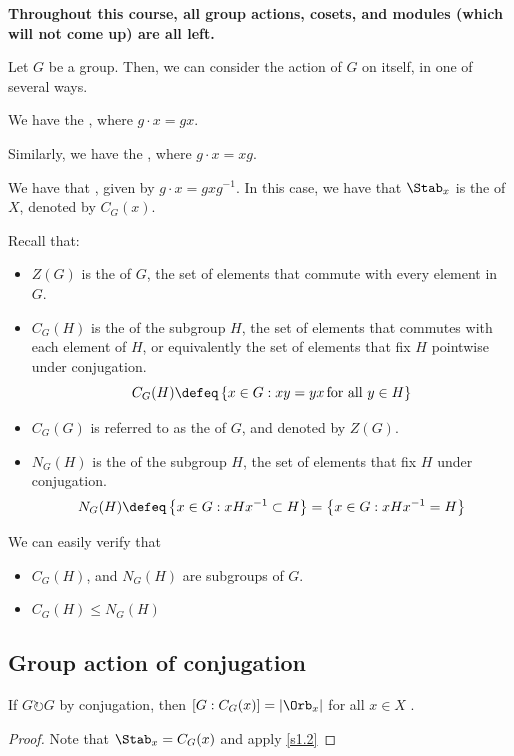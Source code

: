 \documentclass[12pt]{scrartcl}
\begin{document}
\textbf{Throughout this course, all group actions, cosets, and modules (which will not come up) are all left.}
\begin{example}
Let $G$ be a group.
Then, we can consider the action of $G$ on itself, in one of several ways.
\item We have the , where $g \cdot x = gx$.
\item Similarly, we have the , where $g \cdot x = xg$. 
\item We have that , given by $g \cdot x = gxg^{-1}$.
	In this case, we have that $\Stab_x$ is the  of $X$, denoted by $C_G(x)$. 
\end{example}

Recall that:
\begin{itemize}
	\item $Z(G)$ is the  of $G$, the set of elements that commute with every element in $G$.
			\item $C_G(H)$ is the  of the subgroup $H$, the set of elements that commutes with each element of $H$, or equivalently the set of elements that fix $H$ pointwise under conjugation.
		\[
			C_G(H) \defeq \left\{x \in G: xy = yx \, \textrm{for all }y \in H\right\}
		\] 
	\item $C_G(G)$ is referred to as the  of $G$, and denoted by $Z(G)$.
	\item $N_G(H)$ is the  of the subgroup $H$, the set of elements that fix $H$ under conjugation.
		\[
		N_G(H) \defeq \left\{x \in G: xHx^{-1} \subset H\right\} = \left\{x \in G: xHx^{-1} = H\right\}
		\]
\end{itemize}

We can easily verify that
\begin{itemize}
	\item $C_G(H)$, and $N_G(H)$ are subgroups of $G$.
	\item $C_G(H) \leq N_G(H)$ 
\end{itemize}


\subsection{Group action of conjugation}
\begin{proposition}
	\label{s1.3}
If $G \circlearrowright G$ by conjugation, then $[G: C_G(x)] = |\Orb_x|$ for all $x \in X$ . 
\end{proposition}
\begin{proof}
Note that $\Stab_x = C_G(x)$ and apply \ref{s1.2}
\end{proof}
\end{document}
